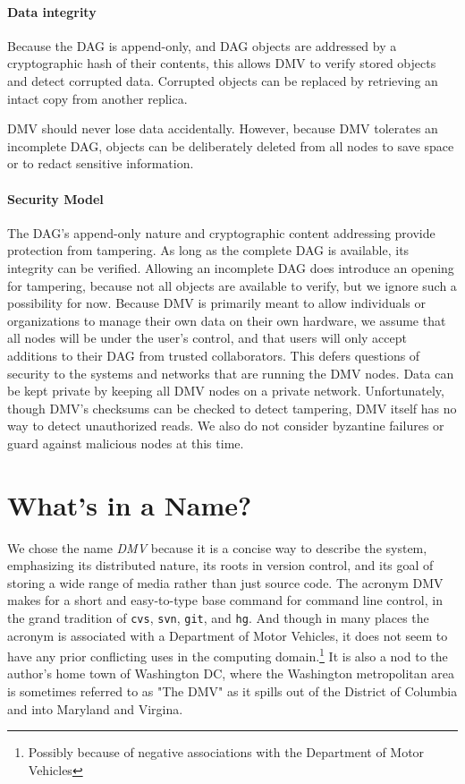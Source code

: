 \paragraph{Data integrity}

Because the \gls{DAG} is append-only, and \gls{DAG} objects are addressed by a
cryptographic hash of their contents, this allows \gls{DMV} to verify stored
objects and detect corrupted data. Corrupted objects can be replaced by
retrieving an intact copy from another replica.

\gls{DMV} should never lose data accidentally. However, because \gls{DMV}
tolerates an incomplete \gls{DAG}, objects can be deliberately deleted from all
nodes to save space or to redact sensitive information.


\paragraph{Security Model}

The \gls{DAG}'s append-only nature and cryptographic content addressing provide
protection from tampering. As long as the complete \gls{DAG} is available, its
integrity can be verified. Allowing an incomplete \gls{DAG} does introduce an
opening for tampering, because not all objects are available to verify, but we
ignore such a possibility for now. Because \gls{DMV} is primarily meant to allow
individuals or organizations to manage their own data on their own hardware, we
assume that all nodes will be under the user's control, and that users will only
accept additions to their \gls{DAG} from trusted collaborators. This defers
questions of security to the systems and networks that are running the \gls{DMV}
nodes. Data can be kept private by keeping all \gls{DMV} nodes on a private
network. Unfortunately, though \gls{DMV}'s checksums can be checked to detect
tampering, \gls{DMV} itself has no way to detect unauthorized reads. We also do
not consider byzantine failures or guard against malicious nodes at this time.

%


\section{What's in a Name?}

We chose the name \emph{\acrlong{DMV}} because it is a concise way to describe
the system, emphasizing its distributed nature, its roots in version control,
and its goal of storing a wide range of media rather than just source code. The
acronym \gls{DMV} makes for a short and easy-to-type base command for command
line control, in the grand tradition of \lstinline{cvs}, \lstinline{svn},
\lstinline{git}, and \lstinline{hg}. And though in many places the acronym is
associated with a Department of Motor Vehicles, it does not seem to have any
prior conflicting uses in the computing domain.\footnote{Possibly because of
negative associations with the Department of Motor Vehicles} It is also a nod to
the author's home town of Washington DC, where the Washington metropolitan area
is sometimes referred to as "The DMV" as it spills out of the District of
Columbia and into Maryland and Virgina.
